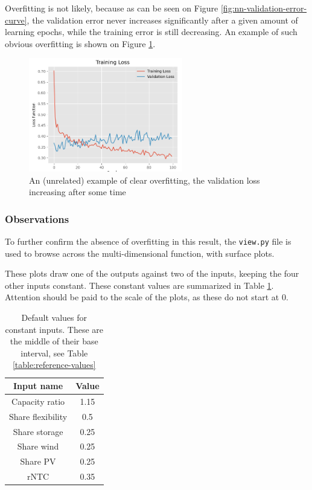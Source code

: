 Overfitting is not likely, because as can be seen on Figure \ref{fig:nn-validation-error-curve}, the validation error never increases significantly after a given amount of learning epochs, while the training error is still decreasing. An example of such obvious overfitting is shown on Figure \ref{fig:overfitting}.

\begin{figure}[h]
    \centering
    \includegraphics[width=0.6\textwidth]{resources/images/overfitting.png}
    \caption{An (unrelated) example of clear overfitting, the validation loss increasing after some time}
    \label{fig:overfitting}
\end{figure}

\subsubsection{Observations}

To further confirm the absence of overfitting in this result, the \texttt{view.py} file is used to browse across the multi-dimensional function, with surface plots.

These plots draw one of the outputs against two of the inputs, keeping the four other inputs constant. These constant values are summarized in Table \ref{tab:default-view-values}. Attention should be paid to the scale of the plots, as these do not start at 0.

\begin{table}[h!]
    \centering
    \begin{tabular}{|c|c|}
        \hline
        Input name & Value \\ \hline
        Capacity ratio & 1.15 \\
        Share flexibility & 0.5 \\
        Share storage & 0.25 \\
        Share wind & 0.25 \\
        Share PV & 0.25 \\
        rNTC & 0.35 \\ \hline
    \end{tabular}
    \caption{Default values for constant inputs. These are the middle of their base interval, see Table \ref{table:reference-values}}
    \label{tab:default-view-values}
\end{table}


